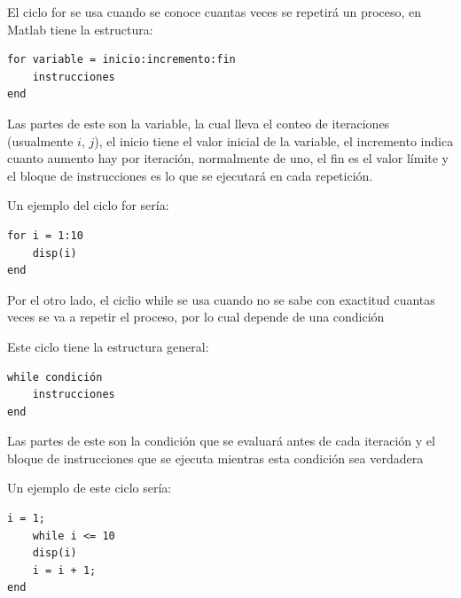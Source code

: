 
\tab El ciclo for se usa cuando se conoce cuantas veces se repetirá un proceso, en Matlab tiene la estructura:
\begin{lstlisting}[style=Matlab-editor]
for variable = inicio:incremento:fin
    instrucciones
end
\end{lstlisting}

\tab Las partes de este son la variable, la cual lleva el conteo de iteraciones (usualmente $i$, $j$), el inicio tiene el valor inicial de la variable, el incremento indica cuanto aumento hay por iteración, normalmente de uno, el fin es el valor límite y el bloque de instrucciones es lo que se ejecutará en cada repetición.

Un ejemplo del ciclo for sería:
\begin{lstlisting}[style=Matlab-editor]
for i = 1:10
    disp(i)
end
\end{lstlisting}

\tab Por el otro lado, el ciclio while se usa cuando no se sabe con exactitud cuantas veces se va a repetir el proceso, por lo cual depende de una condición

Este ciclo tiene la estructura general:

\begin{lstlisting}[style=Matlab-editor]
while condición
    instrucciones
end
\end{lstlisting}

\tab Las partes de este son la condición que se evaluará antes de cada iteración y el bloque de instrucciones que se ejecuta mientras esta condición sea verdadera

Un ejemplo de este ciclo sería:

\begin{lstlisting}[style=Matlab-editor]
i = 1;
    while i <= 10
    disp(i)
    i = i + 1;
end
\end{lstlisting}

